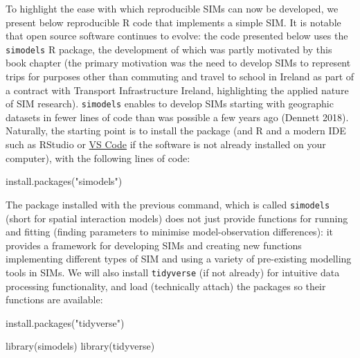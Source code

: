 \documentclass[11pt,letterpaper]{article}
\newenvironment{Shaded}{\begin{snugshade}}{\end{snugshade}}
\newcommand{\FunctionTok}[1]{\textcolor[rgb]{0.00,0.00,0.00}{#1}}
\newcommand{\NormalTok}[1]{#1}
\newcommand{\StringTok}[1]{\textcolor[rgb]{0.31,0.60,0.02}{#1}}
\begin{document}
To highlight the ease with which reproducible SIMs can now be developed, we present below reproducible R code that implements a simple SIM.
It is notable that open source software continues to evolve: the code presented below uses the \texttt{simodels} R package, the development of which was partly motivated by this book chapter (the primary motivation was the need to develop SIMs to represent trips for purposes other than commuting and travel to school in Ireland as part of a contract with Transport Infrastructure Ireland, highlighting the applied nature of SIM research).
\texttt{simodels} enables to develop SIMs starting with geographic datasets in fewer lines of code than was possible a few years ago (Dennett 2018).
Naturally, the starting point is to install the package (and R and a modern IDE such as RStudio or \href{https://marketplace.visualstudio.com/items?itemName=REditorSupport.r}{VS Code} if the software is not already installed on your computer), with the following lines of code:

\begin{Shaded}
\begin{Highlighting}[]
\FunctionTok{install.packages}\NormalTok{(}\StringTok{"simodels"}\NormalTok{)}
\end{Highlighting}
\end{Shaded}

The package installed with the previous command, which is called \texttt{simodels} (short for spatial interaction models) does not just provide functions for running and fitting (finding parameters to minimise model-observation differences): it provides a framework for developing SIMs and creating new functions implementing different types of SIM and using a variety of pre-existing modelling tools in SIMs.
We will also install \texttt{tidyverse} (if not already) for intuitive data processing functionality, and load (technically attach) the packages so their functions are available:

\begin{Shaded}
\begin{Highlighting}[]
\FunctionTok{install.packages}\NormalTok{(}\StringTok{"tidyverse"}\NormalTok{)}
\end{Highlighting}
\end{Shaded}

\begin{Shaded}
\begin{Highlighting}[]
\FunctionTok{library}\NormalTok{(simodels)}
\FunctionTok{library}\NormalTok{(tidyverse)}
\end{Highlighting}
\end{Shaded}
\end{document}
